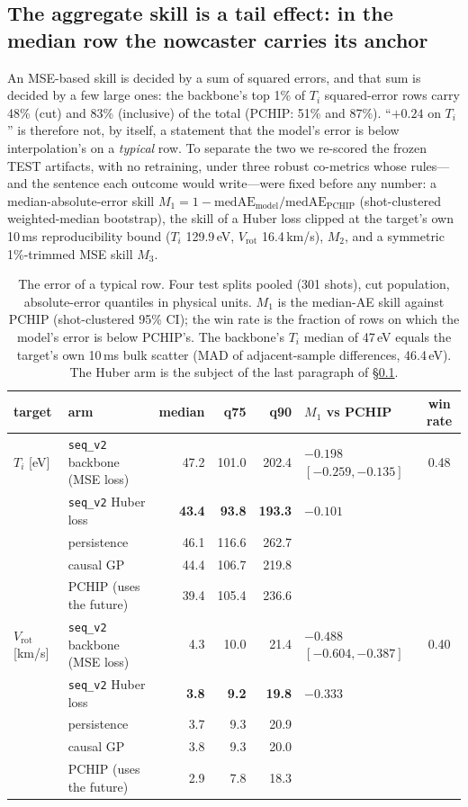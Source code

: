\documentclass[10pt]{article}
\newcommand{\Ti}{\ensuremath{T_i}}
\newcommand{\Vrot}{\ensuremath{V_\mathrm{rot}}}
\newcommand{\seqv}{\texttt{seq\_v2}}
\begin{document}
\subsection{The aggregate skill is a tail effect: in the median row the nowcaster carries its anchor}
\label{sec:bulk}

An MSE-based skill is decided by a sum of squared errors, and that sum is decided by
a few large ones: the backbone's top 1\% of \Ti{} squared-error rows carry 48\% (cut)
and 83\% (inclusive) of the total (PCHIP: 51\% and 87\%). ``$+0.24$ on \Ti{}'' is
therefore not, by itself, a statement that the model's error is below interpolation's on a
\emph{typical} row. To separate the two we re-scored the frozen TEST artifacts, with
no retraining, under three robust co-metrics whose rules---and the sentence each
outcome would write---were fixed before any number: a median-absolute-error skill
$M_1 = 1 - \mathrm{medAE}_{\text{model}}/\mathrm{medAE}_{\text{PCHIP}}$
(shot-clustered weighted-median bootstrap), the skill of a Huber loss clipped at the
target's own 10\,ms reproducibility bound (\Ti{} 129.9\,eV, \Vrot{} 16.4\,km/s),
$M_2$, and a symmetric 1\%-trimmed MSE skill $M_3$.

\begin{table}[t]
  \centering
  \caption{The error of a typical row. Four test splits pooled (301 shots), cut
  population, absolute-error quantiles in physical units. $M_1$ is the median-AE
  skill against PCHIP (shot-clustered 95\% CI); the win rate is the fraction of
  rows on which the model's error is below PCHIP's. The backbone's \Ti{} median of
  47\,eV equals the target's own 10\,ms bulk scatter (MAD of adjacent-sample
  differences, 46.4\,eV). The Huber arm is the subject of the last paragraph of
  \S\ref{sec:bulk}.}
  \label{tab:bulk}
  \small
  \begin{tabular}{llrrrlc}
    \toprule
    target & arm & median & q75 & q90 & $M_1$ vs PCHIP & win rate \\
    \midrule
    \Ti{} [eV]
      & \seqv{} backbone (MSE loss) & 47.2 & 101.0 & 202.4 & $-0.198$ $[-0.259, -0.135]$ & 0.48 \\
      & \seqv{} Huber loss & \textbf{43.4} & \textbf{93.8} & \textbf{193.3} & $-0.101$ & \\
      & persistence & 46.1 & 116.6 & 262.7 & & \\
      & causal GP & 44.4 & 106.7 & 219.8 & & \\
      & PCHIP (uses the future) & 39.4 & 105.4 & 236.6 & & \\
    \midrule
    \Vrot{} [km/s]
      & \seqv{} backbone (MSE loss) & 4.3 & 10.0 & 21.4 & $-0.488$ $[-0.604, -0.387]$ & 0.40 \\
      & \seqv{} Huber loss & \textbf{3.8} & \textbf{9.2} & \textbf{19.8} & $-0.333$ & \\
      & persistence & 3.7 & 9.3 & 20.9 & & \\
      & causal GP & 3.8 & 9.3 & 20.0 & & \\
      & PCHIP (uses the future) & 2.9 & 7.8 & 18.3 & & \\
    \bottomrule
  \end{tabular}
\end{table}
\end{document}

